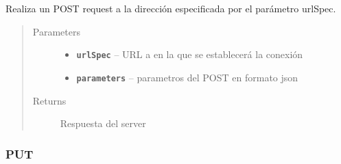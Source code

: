 \documentclass[letterpaper,10pt,english]{sphinxmanual}
\begin{document}
\begin{fulllineitems}
\label{Singletons/ServerHandler:com.fiuba.tallerii.jobify.ServerHandler.POST(String, String)}
Realiza un POST request a la dirección especificada por el parámetro urlSpec.
\begin{quote}\begin{description}
\item[{Parameters}] \leavevmode\begin{itemize}
\item {} 
\textbf{\texttt{urlSpec}} -- URL a en la que se establecerá la conexión

\item {} 
\textbf{\texttt{parameters}} -- parametros del POST en formato json

\end{itemize}

\item[{Returns}] \leavevmode
Respuesta del server

\end{description}\end{quote}

\end{fulllineitems}



\subsubsection{PUT}
\label{Singletons/ServerHandler:put}
\end{document}
